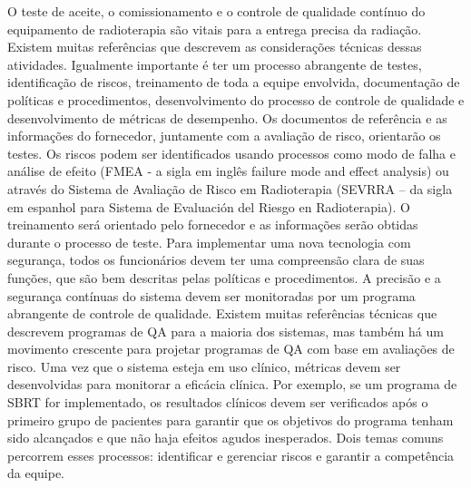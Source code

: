 \documentclass[11pt,a4paper]{article}
\newcounter{exemplo}
\begin{document}
	O teste de aceite, o comissionamento e o controle de qualidade contínuo do equipamento de radioterapia são vitais para a entrega precisa da radiação. Existem muitas referências que descrevem as considerações técnicas dessas atividades. Igualmente importante é ter um processo abrangente de testes, identificação de riscos, treinamento de toda a equipe envolvida, documentação de políticas e procedimentos, desenvolvimento do processo de controle de qualidade e desenvolvimento de métricas de desempenho. Os documentos de referência e as informações do fornecedor, juntamente com a avaliação de risco, orientarão os testes. Os riscos podem ser identificados usando processos como modo de falha e análise de efeito (FMEA - a sigla em inglês failure mode and effect analysis) ou através do Sistema de Avaliação de Risco em Radioterapia (SEVRRA – da sigla em espanhol para Sistema de Evaluación del Riesgo en Radioterapia). O treinamento será orientado pelo fornecedor e as informações serão obtidas durante o processo de teste. Para implementar uma nova tecnologia com segurança, todos os funcionários devem ter uma compreensão clara de suas funções, que são bem descritas pelas políticas e procedimentos. A precisão e a segurança contínuas do sistema devem ser monitoradas por um programa abrangente de controle de qualidade. Existem muitas referências técnicas que descrevem programas de QA para a maioria dos sistemas, mas também há um movimento crescente para projetar programas de QA com base em avaliações de risco. Uma vez que o sistema esteja em uso clínico, métricas devem ser desenvolvidas para monitorar a eficácia clínica. Por exemplo, se um programa de SBRT for implementado, os resultados clínicos devem ser verificados após o primeiro grupo de pacientes para garantir que os objetivos do programa tenham sido alcançados e que não haja efeitos agudos inesperados. Dois temas comuns percorrem esses processos: identificar e gerenciar riscos e garantir a competência da equipe.



\end{document}

